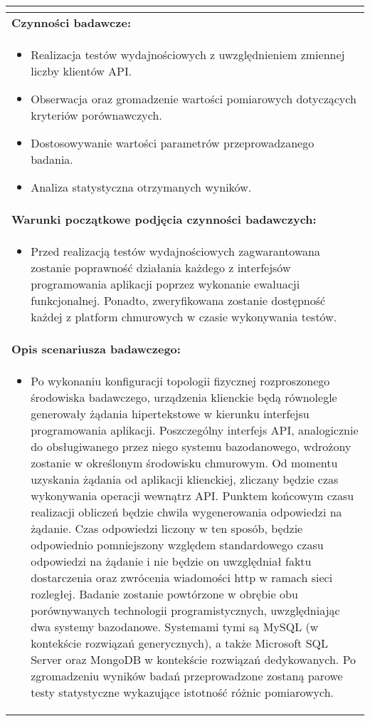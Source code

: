 \begin{longtable}[c]{|llll|}
{\begin{itemize}
        \end{itemize}}                                                           \\ \hline
    \multicolumn{4}{|l|}{\textbf{Czynności badawcze:}}                               \\ \hline
    \multicolumn{4}{|p{\linewidth}|}{
        \begin{itemize}
            \item Realizacja testów wydajnościowych z uwzględnieniem zmiennej liczby klientów API.
            \item Obserwacja oraz gromadzenie wartości pomiarowych dotyczących kryteriów porównawczych.
            \item Dostosowywanie wartości parametrów przeprowadzanego badania.
            \item Analiza statystyczna otrzymanych wyników.
        \end{itemize}
    }                                                           \\ \hline
    \multicolumn{4}{|l|}{\textbf{Warunki początkowe podjęcia czynności badawczych:}} \\ \hline
    \multicolumn{4}{|p{\linewidth}|}{
        \begin{itemize}[label={}]
            \item Przed realizacją testów wydajnościowych zagwarantowana zostanie poprawność działania każdego z interfejsów programowania aplikacji poprzez wykonanie ewaluacji funkcjonalnej. Ponadto, zweryfikowana zostanie dostępność każdej z platform chmurowych w czasie wykonywania testów.  
          \end{itemize}
    }                                                           \\ \hline
    \multicolumn{4}{|l|}{\textbf{Opis scenariusza badawczego:}}                      \\ \hline
    \multicolumn{4}{|p{\linewidth}|}{
        \begin{itemize}[label={}]
            \item Po wykonaniu konfiguracji topologii fizycznej rozproszonego środowiska badawczego, urządzenia klienckie będą równolegle generowały żądania hipertekstowe w kierunku interfejsu programowania aplikacji. Poszczególny interfejs API, analogicznie do obsługiwanego przez niego systemu bazodanowego, wdrożony zostanie w określonym środowisku chmurowym. Od momentu uzyskania żądania od aplikacji klienckiej, zliczany będzie czas wykonywania operacji wewnątrz API. Punktem końcowym czasu realizacji obliczeń będzie chwila wygenerowania odpowiedzi na żądanie. Czas odpowiedzi liczony w ten sposób, będzie odpowiednio pomniejszony względem standardowego czasu odpowiedzi na żądanie i nie będzie on uwzględniał faktu dostarczenia oraz zwrócenia wiadomości http w ramach sieci rozległej. Badanie zostanie powtórzone w obrębie obu porównywanych technologii programistycznych, uwzględniając dwa systemy bazodanowe. Systemami tymi są MySQL (w kontekście rozwiązań generycznych), a także Microsoft SQL Server oraz MongoDB w kontekście rozwiązań dedykowanych. Po zgromadzeniu wyników badań przeprowadzone zostaną parowe testy statystyczne wykazujące istotność różnic pomiarowych.

\end{itemize}}
\end{longtable}
